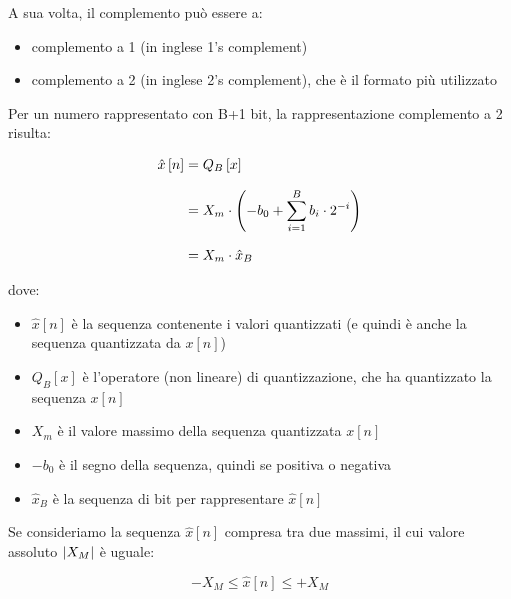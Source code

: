 A sua volta, il complemento può essere a: 

\begin{itemize}
    \item complemento a 1 (in inglese 1's complement) 
    \item complemento a 2 (in inglese 2's complement), che è il formato più utilizzato 
\end{itemize} 

Per un numero rappresentato con B+1 bit, la rappresentazione complemento a 2 risulta: 

{
    \Large 
    \begin{equation}
        \setlength{\jot}{10pt} %
        \begin{split}
            \hat{x} \left[ n\right] 
            &= 
            Q_{B} \left[ x\right] 
            \\
            &= 
            X_{m} 
            \cdot 
            \left(
                -b_{0} 
                + 
                \sum_{i = 1}^{B} 
                b_{i} 
                \cdot 
                2^{-i}
            \right) 
            \\
            &= 
            X_{m} \cdot \hat{x}_{B}
        \end{split}
    \end{equation}
}

dove: 

\begin{itemize}
    \item $\hat{x} \left[ n\right]$ è la sequenza contenente i valori quantizzati (e quindi è anche la sequenza quantizzata da $x \left[ n\right]$) 
    \item $Q_{B} \left[ x\right]$ è l'operatore (non lineare) di quantizzazione, che ha quantizzato la sequenza $x \left[ n\right]$ 
    \item $X_{m}$ è il valore massimo della sequenza quantizzata $x \left[ n\right]$ 
    \item $-b_{0}$ è il segno della sequenza, quindi se positiva o negativa 
    \item $\hat{x}_{B}$ è la sequenza di bit per rappresentare $\hat{x} \left[ n\right] $ 
\end{itemize}

Se consideriamo la sequenza $\hat{x} \left[ n\right]$ compresa tra due massimi, il cui valore assoluto $\abs{X_{M}}$ è uguale: 

{
    \Large 
    \begin{equation}
        - X_{M} \leq \hat{x} \left[ n\right] \leq + X_{M}
    \end{equation}
}

